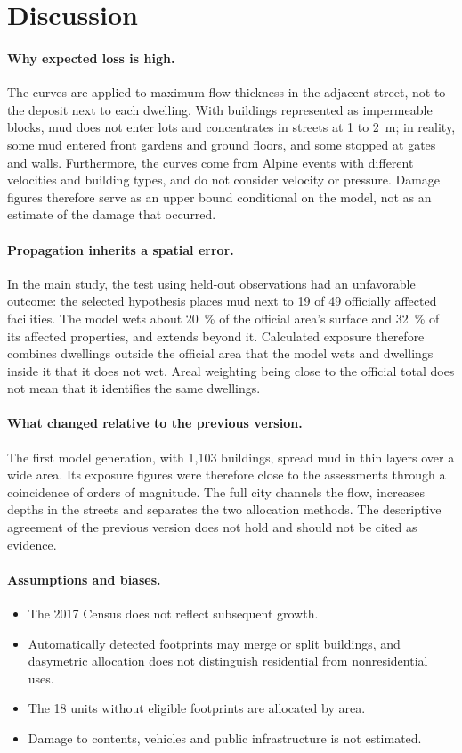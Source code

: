\documentclass[10pt,a4paper]{article}
\begin{document}
\section{Discussion}
\paragraph{Why expected loss is high.} The curves are applied to maximum flow thickness in the adjacent street, not to the deposit next to each dwelling. With buildings represented as impermeable blocks, mud does not enter lots and concentrates in streets at 1 to \SI{2}{m}; in reality, some mud entered front gardens and ground floors, and some stopped at gates and walls. Furthermore, the curves come from Alpine events with different velocities and building types, and do not consider velocity or pressure. Damage figures therefore serve as an upper bound conditional on the model, not as an estimate of the damage that occurred.
\paragraph{Propagation inherits a spatial error.} In the main study, the test using held-out observations had an unfavorable outcome: the selected hypothesis places mud next to 19 of 49 officially affected facilities. The model wets about 20~\% of the official area's surface and 32~\% of its affected properties, and extends beyond it. Calculated exposure therefore combines dwellings outside the official area that the model wets and dwellings inside it that it does not wet. Areal weighting being close to the official total does not mean that it identifies the same dwellings.
\paragraph{What changed relative to the previous version.} The first model generation, with 1,103 buildings, spread mud in thin layers over a wide area. Its exposure figures were therefore close to the assessments through a coincidence of orders of magnitude. The full city channels the flow, increases depths in the streets and separates the two allocation methods. The descriptive agreement of the previous version does not hold and should not be cited as evidence.
\paragraph{Assumptions and biases.}
\begin{itemize}
\item The 2017 Census does not reflect subsequent growth.
\item Automatically detected footprints may merge or split buildings, and dasymetric allocation does not distinguish residential from nonresidential uses.
\item The 18 units without eligible footprints are allocated by area.
\item Damage to contents, vehicles and public infrastructure is not estimated.
\end{itemize}
\end{document}
